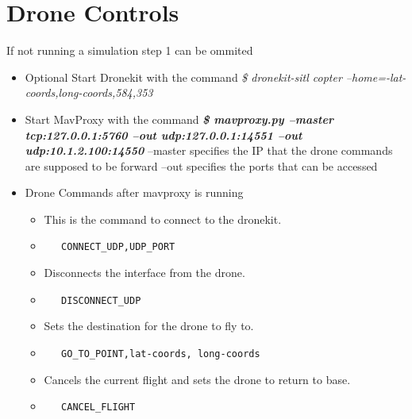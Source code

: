 \section{Drone Controls}
If not running a simulation step 1 can be ommited
\begin{itemize}
    \item {Optional} Start Dronekit with the command 
        \newline\textit{\$ dronekit-sitl copter --home=-lat-coords,long-coords,584,353}
    \item Start MavProxy with the command 
        \newline \textbf{\textit{\$ mavproxy.py --master tcp:127.0.0.1:5760 --out udp:127.0.0.1:14551 --out udp:10.1.2.100:14550}}
        \newline --master specifies the IP that the drone commands are supposed to be forward
        \newline --out specifies the ports that can be accessed 
    \item Drone Commands after mavproxy is running
    \begin{itemize}
        \item This is the command to connect to the dronekit.
        \item [] \begin{verbatim}   CONNECT_UDP,UDP_PORT\end{verbatim} 
        \item Disconnects the interface from the drone.
        \item [] \begin{verbatim}   DISCONNECT_UDP\end{verbatim}
        \item Sets the destination for the drone to fly to.
        \item [] \begin{verbatim}   GO_TO_POINT,lat-coords, long-coords\end{verbatim}
        \item Cancels the current flight and sets the drone to return to base.
        \item [] \begin{verbatim}   CANCEL_FLIGHT\end{verbatim}
     \end{itemize}
\end{itemize}